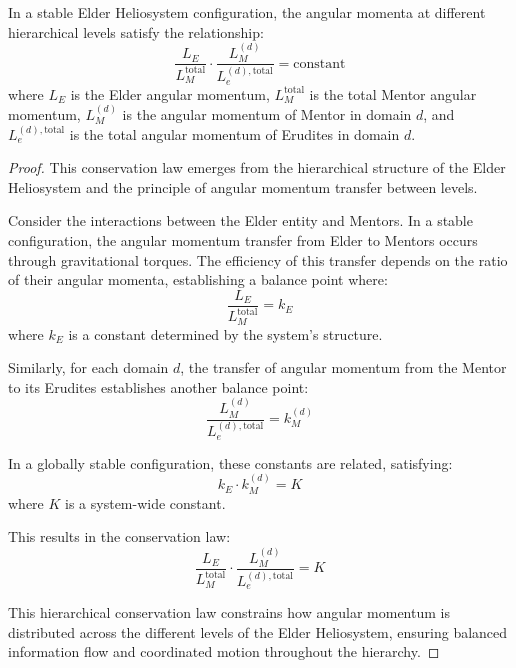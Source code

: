 \begin{theorem}
In a stable Elder Heliosystem configuration, the angular momenta at different hierarchical levels satisfy the relationship:
\begin{equation}
\frac{L_E}{L_M^{\text{total}}} \cdot \frac{L_M^{(d)}}{L_e^{(d),\text{total}}} = \text{constant}
\end{equation}
where $L_E$ is the Elder angular momentum, $L_M^{\text{total}}$ is the total Mentor angular momentum, $L_M^{(d)}$ is the angular momentum of Mentor in domain $d$, and $L_e^{(d),\text{total}}$ is the total angular momentum of Erudites in domain $d$.
\end{theorem}

\begin{proof}
This conservation law emerges from the hierarchical structure of the Elder Heliosystem and the principle of angular momentum transfer between levels.

Consider the interactions between the Elder entity and Mentors. In a stable configuration, the angular momentum transfer from Elder to Mentors occurs through gravitational torques. The efficiency of this transfer depends on the ratio of their angular momenta, establishing a balance point where:
\begin{equation}
\frac{L_E}{L_M^{\text{total}}} = k_E
\end{equation}
where $k_E$ is a constant determined by the system's structure.

Similarly, for each domain $d$, the transfer of angular momentum from the Mentor to its Erudites establishes another balance point:
\begin{equation}
\frac{L_M^{(d)}}{L_e^{(d),\text{total}}} = k_M^{(d)}
\end{equation}

In a globally stable configuration, these constants are related, satisfying:
\begin{equation}
k_E \cdot k_M^{(d)} = K
\end{equation}
where $K$ is a system-wide constant.

This results in the conservation law:
\begin{equation}
\frac{L_E}{L_M^{\text{total}}} \cdot \frac{L_M^{(d)}}{L_e^{(d),\text{total}}} = K
\end{equation}

This hierarchical conservation law constrains how angular momentum is distributed across the different levels of the Elder Heliosystem, ensuring balanced information flow and coordinated motion throughout the hierarchy.
\end{proof}

